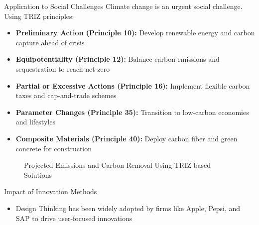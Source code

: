 \documentclass[final]{beamer}
\begin{document}
\begin{frame}{}
\begin{columns}[t]
\begin{column}{.3\linewidth}
			\begin{block}{Application to Social Challenges}
				Climate change is an urgent social challenge. Using TRIZ principles:
				\begin{itemize}
					\item \textbf{Preliminary Action (Principle 10):} Develop renewable energy and carbon capture ahead of crisis
					\item \textbf{Equipotentiality (Principle 12):} Balance carbon emissions and sequestration to reach net-zero
					\item \textbf{Partial or Excessive Actions (Principle 16):} Implement flexible carbon taxes and cap-and-trade schemes
					\item \textbf{Parameter Changes (Principle 35):} Transition to low-carbon economies and lifestyles
					\item \textbf{Composite Materials (Principle 40):} Deploy carbon fiber and green concrete for construction
				\end{itemize}
				\vspace{1.23cm}
				\begin{figure}
					\caption{Projected Emissions and Carbon Removal Using TRIZ-based Solutions}
				\end{figure}
			\end{block}
			\vspace{1cm}
			\begin{block}{Impact of Innovation Methods}
				\begin{itemize}
					\item Design Thinking has been widely adopted by firms like Apple, Pepsi, and SAP to drive user-focused innovations

\end{itemize}
\end{block}
\end{column}
\end{columns}
\end{frame}
\end{document}
